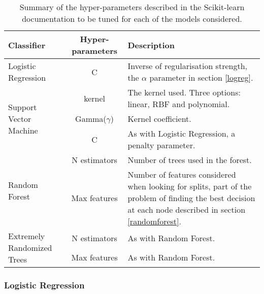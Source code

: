 \begin{table}
    \centering
    \small
    \begin{tabular}{p{} c p{}}
        
        Classifier                                  & Hyper-parameters     & Description \\
        \hline
        Logistic Regression                         & C                         &  Inverse of regularisation strength, the $\alpha$ parameter in section \ref{logreg}. \\
        \hline 
        \multirow{3}{*}{\parbox{0.2\textwidth}{Support Vector Machine}}     & kernel                    &  The kernel used. Three options: linear, \ac{RBF} and polynomial. \\
                                                    & Gamma($\gamma$)           &  Kernel coefficient. \\
                                                    & C                         &  As with Logistic Regression, a penalty parameter. \\
        \hline 
        \multirow{2}{*}{\parbox{0.2\textwidth}{Random Forest}}              & N estimators              &  Number of trees used in the forest. \\
                                                    & Max features              &  Number of features considered when looking for splits, part of the problem of finding the best decision at each node described in section \ref{randomforest}. \\
        \hline 
        \multirow{2}{*}{\parbox{0.2\textwidth}{Extremely Randomized Trees}} & N estimators              &  As with Random Forest. \\
                                                    & Max features              &  As with Random Forest. \\
    \end{tabular}
    \caption{Summary of the hyper-parameters described in the Scikit-learn \autocite{pedregosa_scikit-learn:_2011} documentation to be tuned for each of the models considered.}
    \label{tab:hyper}
\end{table}


\subsubsection*{Logistic Regression}
\label{logreg}

